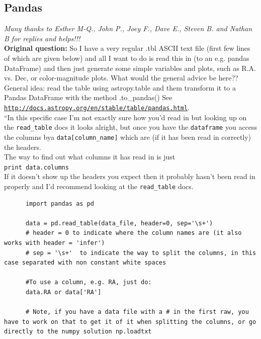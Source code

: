 \documentclass[11pt,a4paper]{article}
\begin{document}
\newpage
    \subsection{Pandas}

    \smallskip
    \noindent
    {\it Many thanks to Esther M-Q., John P., Joey F., Dave E., Steven B. and Nathan B 
    for replies and helps!!!}\\

    \smallskip
    \noindent
    {\bf Original question:} So I have a very regular .tbl ASCII text
    file (first few lines of which are given below) and all I want to do
    is read this in (to an e.g. pandas DataFrame) and then just generate
    some simple variables and plots, such as R.A. vs. Dec, or
    color-magnitude plots. What would the general advice be here??\\

    \smallskip
    \smallskip
    \noindent
    General idea: read the table using astropy.table and them transform it to a Pandas DataFrame with the method .to\_pandas()
    See \\
    \href{http://docs.astropy.org/en/stable/table/pandas.html}{\tt http://docs.astropy.org/en/stable/table/pandas.html}. \\

    \smallskip
    \smallskip
    \noindent
    ``In this specific case I'm not exactly sure how you'd read in but
    looking up on the {\tt read\_table} docs it looks alright, but once
    you have the {\tt dataframe} you access the columns bya
    {\tt data[column\_name]} which are (if it has been read in correctly) the
    headers. \\
    
    \smallskip
    \smallskip
    \noindent
    The way to find out what columns it has read in is just\\
    {\tt print data.columns}\\

    \noindent
    If it doesn't show up the headers you expect then it probably
    hasn't been read in properly and I'd recommend looking at the
    {\tt read\_table} docs. 
    

    \begin{lstlisting}
      import pandas as pd
      
      data = pd.read_table(data_file, header=0, sep='\s+')
      # header = 0 to indicate where the column names are (it also works with header = 'infer')
      # sep = '\s+'  to indicate the way to split the columns, in this case separated with non constant white spaces

      #To use a column, e.g. RA, just do:
      data.RA or data['RA']

      # Note, if you have a data file with a # in the first raw, you have to work on that to get it of it when splitting the columns, or go directly to the numpy solution np.loadtxt 
    \end{lstlisting}
    \medskip     \medskip     \medskip
\end{document}
